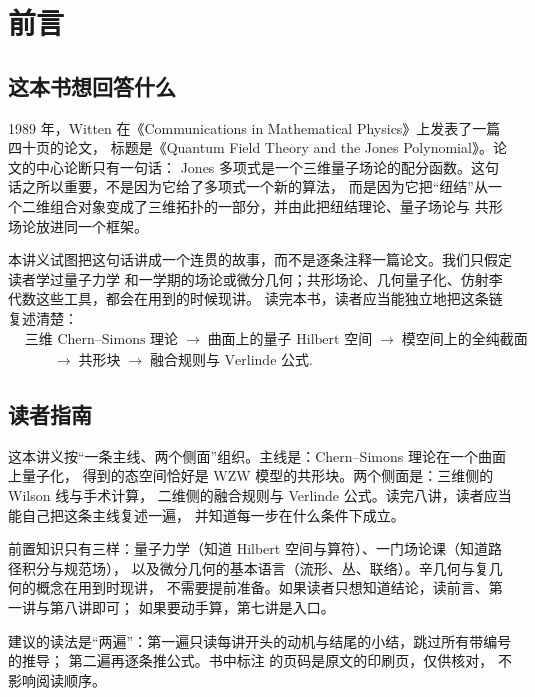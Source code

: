\section*{前言}

\subsection*{这本书想回答什么}

1989 年，Witten 在《Communications in Mathematical Physics》上发表了一篇四十页的论文，
标题是《Quantum Field Theory and the Jones Polynomial》。论文的中心论断只有一句话：
Jones 多项式是一个三维量子场论的配分函数。这句话之所以重要，不是因为它给了多项式一个新的算法，
而是因为它把“纽结”从一个二维组合对象变成了三维拓扑的一部分，并由此把纽结理论、量子场论与
共形场论放进同一个框架。

本讲义试图把这句话讲成一个连贯的故事，而不是逐条注释一篇论文。我们只假定读者学过量子力学
和一学期的场论或微分几何；共形场论、几何量子化、仿射李代数这些工具，都会在用到的时候现讲。
读完本书，读者应当能独立地把这条链复述清楚：
\[
\begin{aligned}
&\text{三维 Chern--Simons 理论}
\;\longrightarrow\;
\text{曲面上的量子 Hilbert 空间}
\;\longrightarrow\;
\text{模空间上的全纯截面}\\
&\qquad\longrightarrow\;
\text{共形块}
\;\longrightarrow\;
\text{融合规则与 Verlinde 公式}.
\end{aligned}
\]

\subsection*{读者指南}

这本讲义按“一条主线、两个侧面”组织。主线是：Chern--Simons 理论在一个曲面上量子化，
得到的态空间恰好是 WZW 模型的共形块。两个侧面是：三维侧的 Wilson 线与手术计算，
二维侧的融合规则与 Verlinde 公式。读完八讲，读者应当能自己把这条主线复述一遍，
并知道每一步在什么条件下成立。

前置知识只有三样：量子力学（知道 Hilbert 空间与算符）、一门场论课（知道路径积分与规范场），
以及微分几何的基本语言（流形、丛、联络）。辛几何与复几何的概念在用到时现讲，
不需要提前准备。如果读者只想知道结论，读前言、第一讲与第八讲即可；
如果要动手算，第七讲是入口。

建议的读法是“两遍”：第一遍只读每讲开头的动机与结尾的小结，跳过所有带编号的推导；
第二遍再逐条推公式。书中标注  的页码是原文的印刷页，仅供核对，
不影响阅读顺序。

